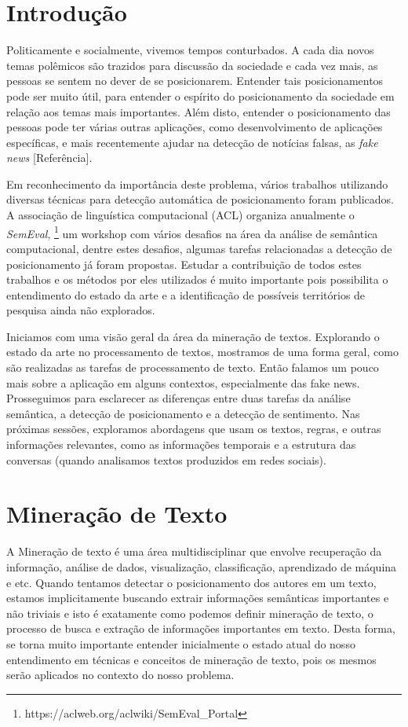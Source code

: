 \section{Introdução}
\quad Politicamente e socialmente, vivemos tempos conturbados. A cada dia
novos temas polêmicos são trazidos para discussão da sociedade e cada
vez mais, as pessoas se sentem no dever de se posicionarem. Entender
tais posicionamentos pode ser muito útil, para entender o espírito do
posicionamento da sociedade em relação aos temas mais importantes.
\quad Além disto, entender o posicionamento das pessoas pode ter
várias outras aplicações, como desenvolvimento de aplicações específicas,
e mais recentemente ajudar na detecção de notícias falsas, as 
\emph{fake news} [Referência].

\quad Em reconhecimento da importância deste problema, vários trabalhos
utilizando diversas técnicas para detecção automática de posicionamento
foram publicados. A associação de linguística computacional (ACL)
organiza anualmente o \emph{SemEval},
\footnote{https://aclweb.org/aclwiki/SemEval\_Portal} um workshop com vários
desafios na área da análise de semântica computacional, dentre estes
desafios, algumas tarefas relacionadas a detecção de posicionamento já
foram propostas. Estudar a contribuição de todos estes trabalhos e os
métodos por eles utilizados é muito importante pois possibilita o
entendimento do estado da arte e a identificação de possíveis
territórios de pesquisa ainda não explorados.

\quad Iniciamos com uma visão geral da área da mineração de textos. Explorando
o estado da arte no processamento de textos, mostramos de uma forma geral,
como são realizadas as tarefas de processamento de texto. Então falamos um
pouco mais sobre a aplicação em alguns contextos, especialmente das fake news.
Prosseguimos para esclarecer as diferenças entre duas tarefas da análise 
semântica, a detecção de posicionamento e a detecção de sentimento. Nas
próximas sessões, exploramos abordagens que usam os textos, regras, e outras
informações relevantes, como as informações temporais e a estrutura das
conversas (quando analisamos textos produzidos em redes sociais).

\section{Mineração de Texto}

\quad A Mineração de texto é uma área multidisciplinar que envolve recuperação da
informação, análise de dados, visualização, classificação, aprendizado de máquina
e etc. Quando tentamos detectar o posicionamento dos autores em um texto, estamos
implicitamente buscando extrair informações semânticas importantes e não triviais
e isto é exatamente como podemos definir mineração de texto, o processo de busca
e extração de informações importantes em texto. Desta forma, se torna muito
importante entender inicialmente o estado atual do nosso entendimento em técnicas
e conceitos de mineração de texto, pois os mesmos serão aplicados no contexto do
nosso problema.

